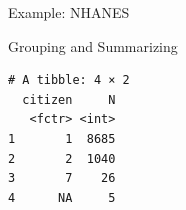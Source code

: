 \documentclass[ignorenonframetext,]{beamer}
\newenvironment{Shaded}{\begin{snugshade}}{\end{snugshade}}
\newcommand{\KeywordTok}[1]{\textcolor[rgb]{0.13,0.29,0.53}{\textbf{{#1}}}}
\newcommand{\DataTypeTok}[1]{\textcolor[rgb]{0.13,0.29,0.53}{{#1}}}
\newcommand{\StringTok}[1]{\textcolor[rgb]{0.31,0.60,0.02}{{#1}}}
\newcommand{\NormalTok}[1]{{#1}}
\begin{document}
\begin{frame}[fragile]{Example: NHANES}

\begin{block}{Grouping and Summarizing}

\begin{Shaded}
\end{Shaded}

\begin{verbatim}
# A tibble: 4 × 2
  citizen     N
   <fctr> <int>
1       1  8685
2       2  1040
3       7    26
4      NA     5
\end{verbatim}

\end{block}

\end{frame}
\end{document}
